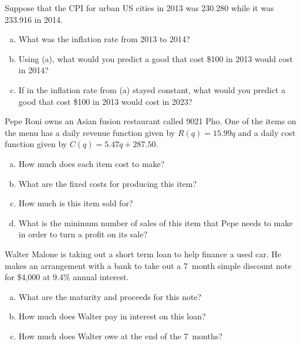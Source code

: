 \documentclass[12pt,letterpaper]{exam}
\begin{document}
\examtitle
{} 
\scores
\bottomline
\newpage

\begin{questions}

\newpage
\question[10] Suppose that the CPI for urban US cities in 2013 was 230.280 while it was 233.916 in 2014. 
	\begin{enumerate}[(a)]
	\item What was the inflation rate from 2013 to 2014?
	\item Using (a), what would you predict a good that cost \$100 in 2013 would cost in 2014?
	\item If in the inflation rate from (a) stayed constant, what would you predict a good that cost \$100 in 2013 would cost in 2023?
	\end{enumerate}



\newpage
\question[10] Pepe Roni owns an Asian fusion restaurant called 9021 Pho. One of the items on the menu has a daily revenue function given by $R(q)= 15.99q$ and a daily cost function given by $C(q)= 5.47q + 287.50$. 
	\begin{enumerate}[(a)]
	\item How much does each item cost to make?
	\item What are the fixed costs for producing this item?
	\item How much is this item sold for?
	\item What is the minimum number of sales of this item that Pepe needs to make in order to turn a profit on its sale?
	\end{enumerate}



\newpage
\question[10] Walter Malone is taking out a short term loan to help finance a used car. He makes an arrangement with a bank to take out a 7~month simple discount note for \$4,000 at 9.4\% annual interest. 
	\begin{enumerate}[(a)]
	\item What are the maturity and proceeds for this note?
	\item How much does Walter pay in interest on this loan?
	\item How much does Walter owe at the end of the 7~months?
	\end{enumerate}




\end{questions}
\end{document}
